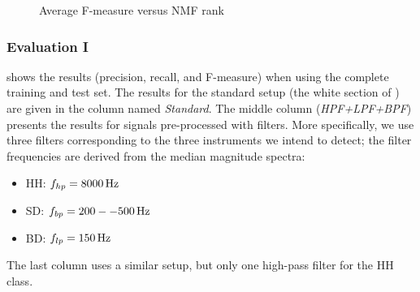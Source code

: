\documentclass{article}
\begin{document}
\begin{figure}
 \centerline{}
 \caption{Average F-measure versus NMF rank}%
 \label{fig:rankTest}
\end{figure}

\subsubsection{Evaluation I}\label{subsec:Evaluation1}
 shows the results (precision, recall, and F-measure) when using the complete training and test set. 
The results for the standard setup (the white section of ) are given in the column named \textit{Standard}. The middle column (\textit{HPF+LPF+BPF}) presents the results for signals pre-processed with filters. More specifically, we use three filters corresponding to the three instruments we intend to detect; the filter frequencies are derived from the median magnitude spectra: 
\begin{itemize}
    \item   HH: $f_{hp} = \unit[8000]{Hz}$
    \item   SD: $f_{bp} = \unit[200--500]{Hz}$
    \item   BD: $f_{lp} = \unit[150]{Hz}$
\end{itemize}
The last column uses a similar setup, but only one high-pass filter for the HH class.
\end{document}

